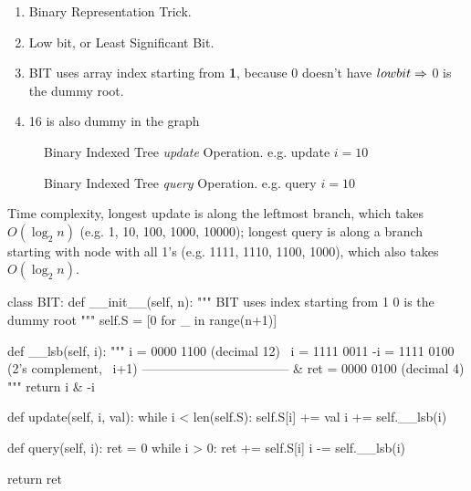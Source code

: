 \begin{enumerate}
\item Binary Representation Trick. 
\item Low bit, or Least Significant Bit. 
\item BIT uses array index starting from \textbf{1}, because 0 doesn't have $lowbit \Rightarrow$ 0 is the dummy root.
\item 16 is also dummy in the graph
\end{enumerate}

\begin{figure}[hbtp]
\centering
{}
\caption{Binary Indexed Tree \textit{update} Operation. e.g. update $i=10$}
\label{fig:LABEL}
\end{figure}

\begin{figure}[hbtp]
\centering
{}
\caption{Binary Indexed Tree \textit{query} Operation.  e.g. query $i=10$}
\label{fig:LABEL}
\end{figure}


Time complexity, longest update is along the leftmost branch, which takes $O(\log_2 n)$ (e.g. 1, 10, 100, 1000, 10000); longest query is along a branch starting with node with all 1's (e.g. 1111, 1110, 1100, 1000), which also takes $O(\log_2 n)$.

\begin{python}
class BIT:
  def __init__(self, n):
    """
    BIT uses index starting from 1
    0 is the dummy root 
    """
    self.S = [0 for _ in range(n+1)]

  def __lsb(self, i):
    """
     i    =  0000 1100   (decimal 12)
    ~i    =  1111 0011
    -i    =  1111 0100   (2's complement, ~i+1)
    -----------------------------------
    & ret =  0000 0100   (decimal 4)
    """
    return i & -i
    
  def update(self, i, val):
    while i < len(self.S):
      self.S[i] += val
      i += self.__lsb(i)
      
  def query(self, i):
    ret = 0
    while i > 0:
      ret += self.S[i]
      i -= self.__lsb(i)

    return ret
\end{python}

